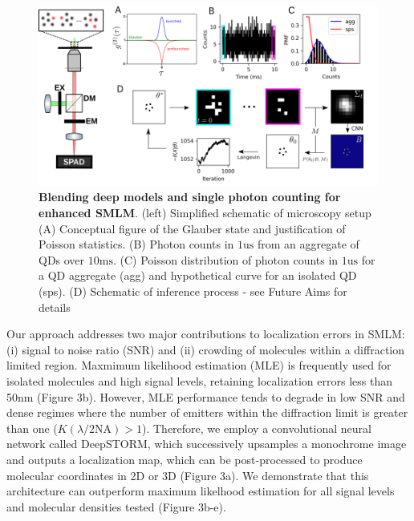 \documentclass{ucetd}
\begin{document}
\begin{figure}
\begin{center}
\includegraphics[width=17cm]{SPAD.png}
\end{center}
\caption{\textbf{Blending deep models and single photon counting for enhanced SMLM}. (left) Simplified schematic of microscopy setup (A) Conceptual figure of the Glauber state and justification of Poisson statistics. (B) Photon counts in $1\mathrm{us}$ from an aggregate of QDs over $10\mathrm{ms}$. (C) Poisson distribution of photon counts in $1\mathrm{us}$ for a QD aggregate (agg) and hypothetical curve for an isolated QD (sps). (D) Schematic of inference process - see Future Aims for details}
\end{figure}


Our approach addresses two major contributions to localization errors in SMLM: (i) signal to noise ratio (SNR) and (ii) crowding of molecules within a diffraction limited region. Maxmimum likelihood estimation (MLE) is frequently used for isolated molecules and high signal levels, retaining localization errors less than 50nm (Figure 3b). However, MLE performance tends to degrade in low SNR and dense regimes where the number of emitters within the diffraction limit is greater than one ($K(\lambda/2\mathrm{NA}) > 1$). Therefore, we employ a convolutional neural network called DeepSTORM, which successively upsamples a monochrome image and outputs a localization map, which can be post-processed to produce molecular coordinates in 2D or 3D (Figure 3a).  We demonstrate that this architecture can outperform maximum likelhood estimation for all signal levels and molecular densities tested (Figure 3b-e).
\end{document}
